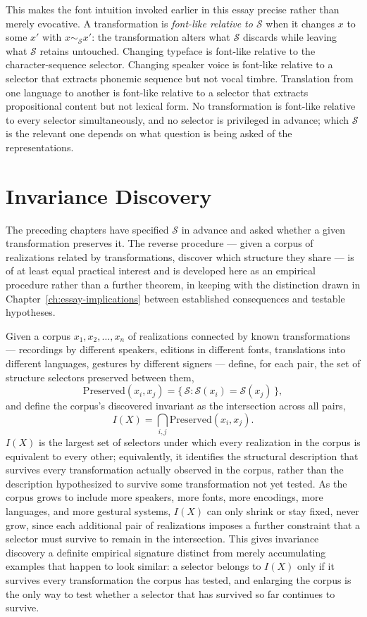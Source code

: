 This makes the font intuition invoked earlier in this essay precise rather than merely evocative. A transformation is \emph{font-like relative to $\mathcal{S}$} when it changes $x$ to some $x'$ with $x \sim_{\mathcal{S}} x'$: the transformation alters what $\mathcal{S}$ discards while leaving what $\mathcal{S}$ retains untouched. Changing typeface is font-like relative to the character-sequence selector. Changing speaker voice is font-like relative to a selector that extracts phonemic sequence but not vocal timbre. Translation from one language to another is font-like relative to a selector that extracts propositional content but not lexical form. No transformation is font-like relative to every selector simultaneously, and no selector is privileged in advance; which $\mathcal{S}$ is the relevant one depends on what question is being asked of the representations.

\section{Invariance Discovery}

The preceding chapters have specified $\mathcal{S}$ in advance and asked whether a given transformation preserves it. The reverse procedure --- given a corpus of realizations related by transformations, discover which structure they share --- is of at least equal practical interest and is developed here as an empirical procedure rather than a further theorem, in keeping with the distinction drawn in Chapter~\ref{ch:essay-implications} between established consequences and testable hypotheses.

Given a corpus $x_1, x_2, \ldots, x_n$ of realizations connected by known transformations --- recordings by different speakers, editions in different fonts, translations into different languages, gestures by different signers --- define, for each pair, the set of structure selectors preserved between them,
\[
\mathrm{Preserved}(x_i, x_j) = \{\, \mathcal{S} : \mathcal{S}(x_i) = \mathcal{S}(x_j) \,\},
\]
and define the corpus's discovered invariant as the intersection across all pairs,
\[
I(X) = \bigcap_{i,j} \mathrm{Preserved}(x_i, x_j).
\]
$I(X)$ is the largest set of selectors under which every realization in the corpus is equivalent to every other; equivalently, it identifies the structural description that survives every transformation actually observed in the corpus, rather than the description hypothesized to survive some transformation not yet tested. As the corpus grows to include more speakers, more fonts, more encodings, more languages, and more gestural systems, $I(X)$ can only shrink or stay fixed, never grow, since each additional pair of realizations imposes a further constraint that a selector must survive to remain in the intersection. This gives invariance discovery a definite empirical signature distinct from merely accumulating examples that happen to look similar: a selector belongs to $I(X)$ only if it survives every transformation the corpus has tested, and enlarging the corpus is the only way to test whether a selector that has survived so far continues to survive.

